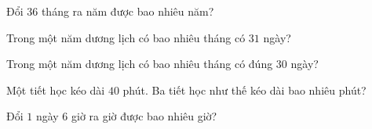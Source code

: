 \begin{ex}
  Đổi $36$ tháng ra năm được bao nhiêu năm?
\end{ex}

\begin{ex}
  Trong một năm dương lịch có bao nhiêu tháng có $31$ ngày?
\end{ex}

\begin{ex}
  Trong một năm dương lịch có bao nhiêu tháng có đúng $30$ ngày?
\end{ex}

\begin{ex}
  Một tiết học kéo dài $40$ phút. Ba tiết học như thế kéo dài bao nhiêu phút?
\end{ex}

\begin{ex}
  Đổi $1$ ngày $6$ giờ ra giờ được bao nhiêu giờ?
\end{ex}
